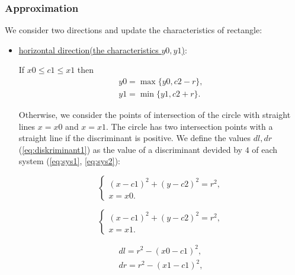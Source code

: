 \documentclass{report}
\begin{document}
	\subsubsection*{Approximation}
	
	We consider two directions and update the characteristics of rectangle:
		
	\begin{itemize}
			
		\item \underline {horizontal direction(the characteristics $y0, y1$)}:
			
		If   $x0 \le c1\le x1$ then
		\begin{equation}
			\begin{gathered}
				y0 = \max\{y0, c2-r\},\\
				y1 = \min\{y1, c2+r\}.
			\end{gathered}
		\end{equation}
		
		Otherwise, we consider the points of intersection of the circle with straight lines $x = x0$ and $x = x1$. The circle has two intersection points with a straight line if the discriminant is positive. We define the values $dl, dr$ (\ref{eq:diskriminant1}) as the value of a discriminant devided by  $4$ of each system (\ref{eq:sys1}, \ref{eq:sys2}):
			
		\begin{equation}
			\begin{cases}
			 	(x - c1)^2 + (y - c2)^2 = r^2,\\ 
			 	x = x0.
			 \end{cases}
			 \label{eq:sys1}
		\end{equation}
			 
		\begin{equation}
			 \begin{cases}
			 	(x - c1)^2 + (y - c2)^2 = r^2,\\ 
			 	x = x1.
			 \end{cases}
			 	\label{eq:sys2}
		\end{equation}
		 
		\begin{equation}
			\begin{gathered}
				dl = r^2 - (x0 - c1)^2,\\
				dr = r^2 - (x1 - c1)^2,\\
				\label{eq:diskriminant1}
			\end{gathered}
		\end{equation}
			

\end{itemize}
\end{document}

